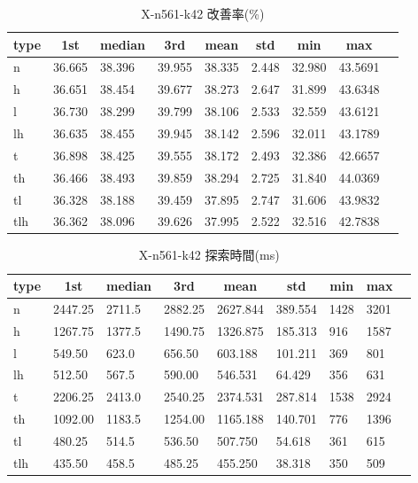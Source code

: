 \begin{table}[htbp]
    \caption{X-n561-k42 改善率(\%)}
    \begin{tabular}{|l|l|l|l|l|l|l|l|l|}\hline
    \multicolumn{1}{|c|}{\textbf{type}}
    &\multicolumn{1}{|c|}{\textbf{1st}}
    &\multicolumn{1}{c|}{\textbf{median}}
    &\multicolumn{1}{c|}{\textbf{3rd}}
    &\multicolumn{1}{c|}{\textbf{mean}}
    &\multicolumn{1}{c|}{\textbf{std}}
    &\multicolumn{1}{c|}{\textbf{min}}
    &\multicolumn{1}{c|}{\textbf{max}}\\\hline
	n & 36.665 & 38.396 & 39.955 & 38.335 & 2.448 & 32.980 & 43.5691\\\hline
	h & 36.651 & 38.454 & 39.677 & 38.273 & 2.647 & 31.899 & 43.6348\\\hline
	l & 36.730 & 38.299 & 39.799 & 38.106 & 2.533 & 32.559 & 43.6121\\\hline
	lh & 36.635 & 38.455 & 39.945 & 38.142 & 2.596 & 32.011 & 43.1789\\\hline
	t & 36.898 & 38.425 & 39.555 & 38.172 & 2.493 & 32.386 & 42.6657\\\hline
	th & 36.466 & 38.493 & 39.859 & 38.294 & 2.725 & 31.840 & 44.0369\\\hline
	tl & 36.328 & 38.188 & 39.459 & 37.895 & 2.747 & 31.606 & 43.9832\\\hline
	tlh & 36.362 & 38.096 & 39.626 & 37.995 & 2.522 & 32.516 & 42.7838\\\hline
	\end{tabular}
\end{table}
\begin{table}[htbp]
    \caption{X-n561-k42 探索時間(ms)}
    \begin{tabular}{|l|l|l|l|l|l|l|l|l|}\hline
    \multicolumn{1}{|c|}{\textbf{type}}
    &\multicolumn{1}{|c|}{\textbf{1st}}
    &\multicolumn{1}{c|}{\textbf{median}}
    &\multicolumn{1}{c|}{\textbf{3rd}}
    &\multicolumn{1}{c|}{\textbf{mean}}
    &\multicolumn{1}{c|}{\textbf{std}}
    &\multicolumn{1}{c|}{\textbf{min}}
    &\multicolumn{1}{c|}{\textbf{max}}\\\hline
	n & 2447.25 & 2711.5 & 2882.25 & 2627.844 & 389.554 & 1428 & 3201\\\hline
	h & 1267.75 & 1377.5 & 1490.75 & 1326.875 & 185.313 & 916 & 1587\\\hline
	l & 549.50 & 623.0 & 656.50 & 603.188 & 101.211 & 369 & 801\\\hline
	lh & 512.50 & 567.5 & 590.00 & 546.531 & 64.429 & 356 & 631\\\hline
	t & 2206.25 & 2413.0 & 2540.25 & 2374.531 & 287.814 & 1538 & 2924\\\hline
	th & 1092.00 & 1183.5 & 1254.00 & 1165.188 & 140.701 & 776 & 1396\\\hline
	tl & 480.25 & 514.5 & 536.50 & 507.750 & 54.618 & 361 & 615\\\hline
	tlh & 435.50 & 458.5 & 485.25 & 455.250 & 38.318 & 350 & 509\\\hline
	\end{tabular}
\end{table}
